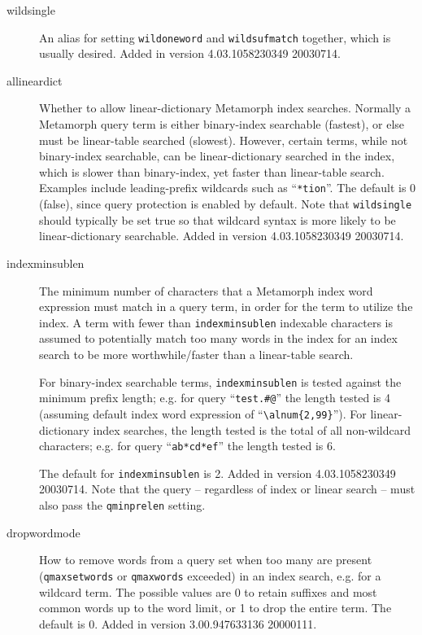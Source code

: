 \begin{description}
\item[wildsingle]
  An alias for setting \verb`wildoneword` and \verb`wildsufmatch`
  together, which is usually desired.  Added in version 4.03.1058230349
  20030714.

\item[allineardict]
  Whether to allow linear-dictionary Metamorph index searches.
  Normally a Metamorph query term is either binary-index searchable
  (fastest), or else must be linear-table searched (slowest).
  However, certain terms, while not binary-index searchable, can be
  linear-dictionary searched in the index, which is slower than
  binary-index, yet faster than linear-table search.  Examples include
  leading-prefix wildcards such as ``\verb`*tion`''.  The default is 0
  (false), since query protection is enabled by default.  Note that
  \verb`wildsingle` should typically be set true so that wildcard
  syntax is more likely to be linear-dictionary searchable.  Added in
  version 4.03.1058230349 20030714.

\item[indexminsublen]
  The minimum number of characters that a Metamorph index word expression
  must match in a query term, in order for the term to utilize the index.
  A term with fewer than \verb`indexminsublen` indexable characters
  is assumed to potentially match too many words in the index for
  an index search to be more worthwhile/faster than a linear-table search.

  For binary-index searchable terms, \verb`indexminsublen` is tested
  against the minimum prefix length; e.g. for query ``\verb`test.#@`''
  the length tested is 4 (assuming default index word expression of
  ``\verb`\alnum{2,99}`'').  For linear-dictionary index searches, the
  length tested is the total of all non-wildcard characters; e.g. for
  query ``\verb`ab*cd*ef`'' the length tested is 6.

  The default for \verb`indexminsublen` is 2.  Added in version
  4.03.1058230349 20030714.  Note that the query -- regardless of
  index or linear search -- must also pass the \verb`qminprelen`
  setting.

\item[dropwordmode]
  How to remove words from a query set when too many are present
  (\verb`qmaxsetwords` or \verb`qmaxwords` exceeded) in an index
  search, e.g. for a wildcard term.  The possible values are 0 to
  retain suffixes and most common words up to the word limit, or 1 to
  drop the entire term.  The default is 0.
  Added in version 3.00.947633136 20000111.


\end{description}
